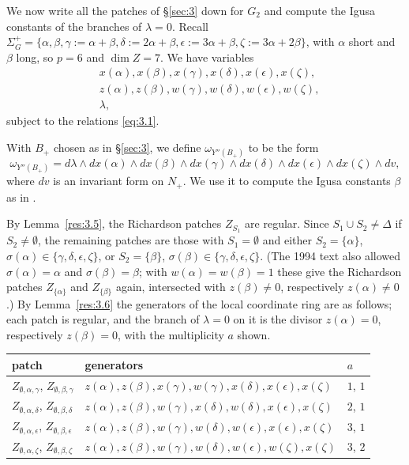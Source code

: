 \documentclass[12pt,letterpaper]{amsart}
\theoremstyle{plain}
\theoremstyle{definition}
\theoremstyle{remark}
\theoremstyle{definition}
\begin{document}
We now write all the patches of \S\ref{sec:3} down for $G_2$ and compute
the Igusa constants of the branches of $\lambda=0$. Recall
$\Sigma_G^+=\{\alpha,\beta,\gamma:=\alpha+\beta,\delta:=2\alpha +\beta,
\epsilon:=3\alpha +\beta,\zeta:=3\alpha +2\beta\}$, with
$\alpha$ short and $\beta$ long, so $p=6$ and $\dim Z=7$. We have variables
\begin{equation}\tag{4.1}\label{eq:4.1}
\begin{split}
&x(\alpha),x(\beta),
x(\gamma),x(\delta),x(\epsilon),x(\zeta),\\
&z(\alpha),z(\beta),
w(\gamma),w(\delta),w(\epsilon),w(\zeta),\\
&\lambda,
\end{split}
\end{equation}
subject to the relations \eqref{eq:3.1}.

With $B_+$ chosen as in \S\ref{sec:3}, we define $\omega_{Y''(B_+)}$ to be
the form
\[
\omega_{Y''(B_+)}=d\lambda
\wedge dx(\alpha)\wedge dx(\beta)
\wedge dx(\gamma)\wedge dx(\delta)\wedge dx(\epsilon)\wedge dx(\zeta)
\wedge dv,
\]
where $dv$ is an invariant form on $N_+$. We use it to compute the Igusa
constants $\beta$ as in \cite{Ha89}.

By Lemma~\ref{res:3.5}, the Richardson patches $Z_{S_1}$ are regular.
Since $S_1\cup S_2\not= \Delta$
if $S_2\not= \emptyset$, the remaining patches are those with
$S_1=\emptyset$ and either $S_2=\{\alpha\}$, $\sigma(\alpha)\in\{\gamma,
\delta,\epsilon,\zeta\}$, or $S_2=\{\beta\}$, $\sigma(\beta)\in\{\gamma,
\delta,\epsilon,\zeta\}$. (The 1994 text also allowed $\sigma(\alpha)=\alpha$
and $\sigma(\beta)=\beta$; with $w(\alpha)=w(\beta)=1$ these give the
Richardson patches $Z_{\{\alpha\}}$ and $Z_{\{\beta\}}$ again, intersected
with $z(\beta)\neq0$, respectively $z(\alpha)\neq0$.) By
Lemma~\ref{res:3.6} the generators of the local coordinate ring are as
follows; each patch is regular, and the branch of $\lambda=0$ on it is the
divisor $z(\alpha)=0$, respectively $z(\beta)=0$, with the multiplicity $a$
shown.

\medskip
\begin{center}
\renewcommand{\arraystretch}{1.15}
\begin{tabular}{@{}lll@{}}
\toprule
patch & generators & $a$\\
\midrule
$Z_{\emptyset,\alpha,\gamma}$, $Z_{\emptyset,\beta,\gamma}$ &
$z(\alpha), z(\beta), x(\gamma), w(\gamma), x(\delta), x(\epsilon), x(\zeta)$ & $1$, $1$\\
$Z_{\emptyset,\alpha,\delta}$, $Z_{\emptyset,\beta,\delta}$ &
$z(\alpha), z(\beta), w(\gamma), x(\delta), w(\delta), x(\epsilon), x(\zeta)$ & $2$, $1$\\
$Z_{\emptyset,\alpha,\epsilon}$, $Z_{\emptyset,\beta,\epsilon}$ &
$z(\alpha), z(\beta), w(\gamma), w(\delta), w(\epsilon), x(\epsilon), x(\zeta)$ & $3$, $1$\\
$Z_{\emptyset,\alpha,\zeta}$, $Z_{\emptyset,\beta,\zeta}$ &
$z(\alpha), z(\beta), w(\gamma), w(\delta), w(\epsilon), w(\zeta), x(\zeta)$ & $3$, $2$\\
\bottomrule
\end{tabular}
\end{center}
\medskip
\end{document}
